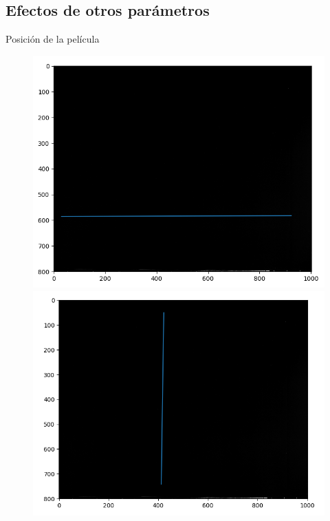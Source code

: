 \documentclass[12pt]{beamer}
\begin{document}
\subsection{Efectos de otros parámetros}

\begin{frame}{Posición de la película}
\begin{figure}[htp]%
	\centering
	\begin{minipage}{0.45\textwidth}
		\includegraphics[width=\textwidth]{images/imagenPerfilMapaCeroHorizontal.png}
	\end{minipage}\hfill
	\begin{minipage}{0.45\textwidth}
		\includegraphics[width=\textwidth]{images/imagenPerfilMapaCeroVertical.png}

\end{minipage}
\end{figure}
\end{frame}
\end{document}
